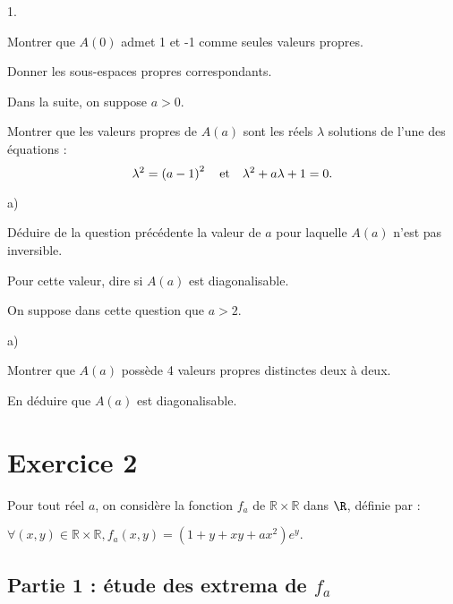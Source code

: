 \documentclass[11pt]{article}%
\begin{document}
\begin{noliste}{1.}
 \setlength{\itemsep}{4mm}
\item Montrer que $A\left( 0\right) $ admet 1 et -1 comme seules
valeurs
propres.

Donner les sous-espaces propres correspondants.

\hspace{-1cm}Dans la suite, on suppose $a>0.$

\item Montrer que les valeurs propres de $A\left( a\right) $ sont les
réels $\lambda $ solutions de l'une des équations : 
\[
\lambda ^{2} = \left( a-1\right) ^{2}\quad \text{et\quad }\lambda
^{2} + a\lambda + 1 = 0.
\]

\item 
\begin{noliste}{a)}
 \setlength{\itemsep}{2mm}
\item Déduire de la question précédente la valeur de $a$ pour
laquelle $A\left( a\right) $ n'est pas inversible.

\item Pour cette valeur, dire si $A\left( a\right) $ est
diagonalisable.
\end{noliste}

\item On suppose dans cette question que $a>2.$

\begin{noliste}{a)}
 \setlength{\itemsep}{2mm}
\item Montrer que $A\left( a\right) $ possède 4 valeurs propres
distinctes deux à deux.

\item En déduire que $A\left( a\right) $ est diagonalisable.
\end{noliste}
\end{noliste}

\section*{Exercice 2}

Pour tout réel $a$, on considère la fonction $f_{a}$ de
$\mathbb{R\times R}$ dans $\R$, définie par :

$\forall \left( x,y\right) \in \mathbb{R\times R},f_{a}\left(
x,y\right)
 = \left( 1 + y + xy + ax^{2}\right) e^{y}.$

\subsection*{Partie 1 : étude des extrema de $f_{a}$}
\end{document}
